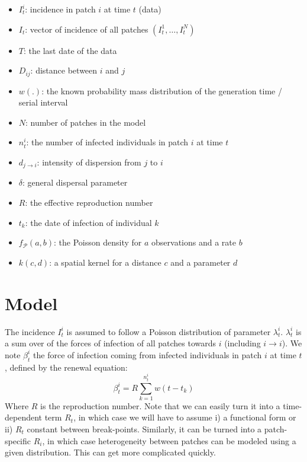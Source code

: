 \documentclass[a4paper,11pt]{article}
\begin{document}
\begin{itemize}
 \item $I_t^i$: incidence in patch $i$ at time $t$ (data)
 \item $I_t$: vector of incidence of all patches $(I_t^1, \ldots, I_t^N)$
 \item $T$: the last date of the data
 \item $D_{ij}$: distance between $i$ and $j$
 \item $w(.)$: the known probability mass distribution of the generation time / serial interval
 \item $N$: number of patches in the model
 \item $n_t^i$: the number of infected individuals in patch $i$ at time $t$
 \item $d_{j\rightarrow i}$: intensity of dispersion from $j$ to $i$
 \item $\delta$: general dispersal parameter
 \item $R$: the effective reproduction number
 \item $t_k$: the date of infection of individual $k$
 \item $f_\mathcal{P}(a,b)$: the Poisson density for $a$ observations and a rate $b$
 \item $k(c,d)$: a spatial kernel for a distance $c$ and a parameter $d$
\end{itemize}





\section{Model}

The incidence $I_t^i$ is assumed to follow a Poisson distribution of parameter 
$\lambda_t^i$.
$\lambda_t^i$ is a sum over of the forces of infection of all patches towards $i$ (including $i \rightarrow i$). 
We note $\beta_t^i$ the force of infection coming from infected individuals in 
patch $i$ at time $t$, defined by the renewal equation:
\begin{equation}
 \beta_t^i = R \sum_{k=1}^{n_t^i} w(t - t_k)
\end{equation}
Where $R$ is the reproduction number. 
Note that we can easily turn it into a time-dependent term $R_t$, in which case 
we will have to assume i) a functional form or ii) $R_t$ constant 
between break-points. 
Similarly, it can be turned into a patch-specific $R_i$, in which case 
heterogeneity between patches can be modeled using a given distribution.
This can get more complicated quickly.
\\
\end{document}
